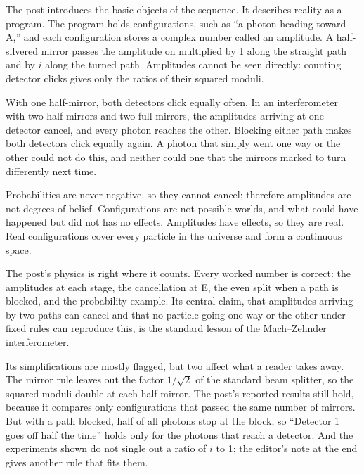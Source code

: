 \begin{afterword}
\summaryhead

The post introduces the basic objects of the sequence. It describes reality as a program. The program holds configurations, such as ``a photon heading toward A,'' and each configuration stores a complex number called an amplitude. A half-silvered mirror passes the amplitude on multiplied by 1 along the straight path and by $i$ along the turned path. Amplitudes cannot be seen directly: counting detector clicks gives only the ratios of their squared moduli.

With one half-mirror, both detectors click equally often. In an interferometer with two half-mirrors and two full mirrors, the amplitudes arriving at one detector cancel, and every photon reaches the other. Blocking either path makes both detectors click equally again. A photon that simply went one way or the other could not do this, and neither could one that the mirrors marked to turn differently next time.

Probabilities are never negative, so they cannot cancel; therefore amplitudes are not degrees of belief. Configurations are not possible worlds, and what could have happened but did not has no effects. Amplitudes have effects, so they are real. Real configurations cover every particle in the universe and form a continuous space.

\responsehead

The post's physics is right where it counts. Every worked number is correct: the amplitudes at each stage, the cancellation at E, the even split when a path is blocked, and the probability example. Its central claim, that amplitudes arriving by two paths can cancel and that no particle going one way or the other under fixed rules can reproduce this, is the standard lesson of the Mach--Zehnder interferometer.

Its simplifications are mostly flagged, but two affect what a reader takes away. The mirror rule leaves out the factor $1/\sqrt{2}$ of the standard beam splitter, so the squared moduli double at each half-mirror. The post's reported results still hold, because it compares only configurations that passed the same number of mirrors. But with a path blocked, half of all photons stop at the block, so ``Detector 1 goes off half the time'' holds only for the photons that reach a detector. And the experiments shown do not single out a ratio of $i$ to 1; the editor's note at the end gives another rule that fits them.


\end{afterword}
